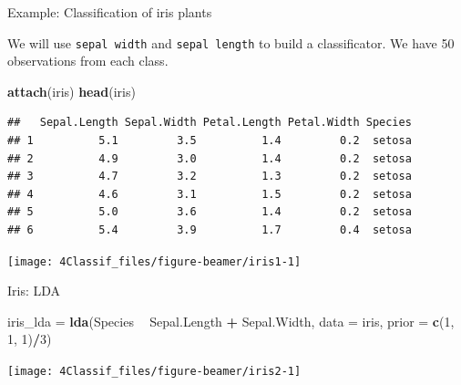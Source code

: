 \documentclass[10pt,ignorenonframetext,]{beamer}
\newenvironment{Shaded}{\begin{snugshade}}{\end{snugshade}}
\newcommand{\KeywordTok}[1]{\textcolor[rgb]{0.13,0.29,0.53}{\textbf{#1}}}
\newcommand{\DataTypeTok}[1]{\textcolor[rgb]{0.13,0.29,0.53}{#1}}
\newcommand{\DecValTok}[1]{\textcolor[rgb]{0.00,0.00,0.81}{#1}}
\newcommand{\StringTok}[1]{\textcolor[rgb]{0.31,0.60,0.02}{#1}}
\newcommand{\OperatorTok}[1]{\textcolor[rgb]{0.81,0.36,0.00}{\textbf{#1}}}
\newcommand{\NormalTok}[1]{#1}
\begin{document}
\begin{frame}[fragile]

\begin{block}{Example: Classification of iris plants}

\vspace{2mm}

We will use \texttt{sepal\ width} and \texttt{sepal\ length} to build a
classificator. We have 50 observations from each class.

\scriptsize

\begin{Shaded}
\begin{Highlighting}[]
\KeywordTok{attach}\NormalTok{(iris)}
\KeywordTok{head}\NormalTok{(iris)}
\end{Highlighting}
\end{Shaded}

\begin{verbatim}
##   Sepal.Length Sepal.Width Petal.Length Petal.Width Species
## 1          5.1         3.5          1.4         0.2  setosa
## 2          4.9         3.0          1.4         0.2  setosa
## 3          4.7         3.2          1.3         0.2  setosa
## 4          4.6         3.1          1.5         0.2  setosa
## 5          5.0         3.6          1.4         0.2  setosa
## 6          5.4         3.9          1.7         0.4  setosa
\end{verbatim}

\end{block}

\end{frame}

\begin{frame}

\begin{center}\texttt{[image: 4Classif\_files/figure-beamer/iris1-1]} \end{center}

\end{frame}

\begin{frame}[fragile]

\begin{block}{Iris: LDA}

\scriptsize

\begin{Shaded}
\begin{Highlighting}[]
\NormalTok{iris_lda =}\StringTok{ }\KeywordTok{lda}\NormalTok{(Species }\OperatorTok{~}\StringTok{ }\NormalTok{Sepal.Length }\OperatorTok{+}\StringTok{ }\NormalTok{Sepal.Width, }\DataTypeTok{data =}\NormalTok{ iris, }\DataTypeTok{prior =} \KeywordTok{c}\NormalTok{(}\DecValTok{1}\NormalTok{, }
    \DecValTok{1}\NormalTok{, }\DecValTok{1}\NormalTok{)}\OperatorTok{/}\DecValTok{3}\NormalTok{)}
\end{Highlighting}
\end{Shaded}

\begin{center}\texttt{[image: 4Classif\_files/figure-beamer/iris2-1]} \end{center}

\end{block}

\end{frame}
\end{document}
